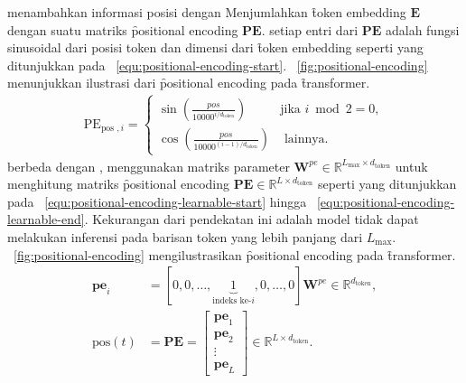 	\cite{transformerori} menambahkan informasi posisi dengan Menjumlahkan \f{token embedding} $\mathbf{E}$ dengan suatu matriks \f{positional encoding} $\mathbf{PE}$. setiap entri dari $\mathbf{PE}$ adalah fungsi sinusoidal dari posisi token  dan dimensi dari \f{token embedding} seperti yang ditunjukkan pada \equ~\ref{equ:positional-encoding-start}. \pic~\ref{fig:positional-encoding} menunjukkan ilustrasi dari \f{positional encoding} pada \f{transformer}.
	\begin{align}
		\label{equ:positional-encoding-start}
		\text{PE}_{ \text {pos }, i}= \begin{cases}\sin \left(\frac{p o s}{10000^{i / d_{\text {token}}}}\right) & \text {jika } i \bmod 2=0 ,\\ \cos \left(\frac{p o s}{10000^{(i-1) / d_{\text {token}}}}\right) & \text { lainnya. }\end{cases}
	\end{align}
	berbeda dengan \cite{transformerori}, \cite{bertori} menggunakan matriks parameter $\mathbf{W}^{pe} \in \mathbb{R}^{L_{\max} \times d_{\text{token}}}$ untuk menghitung matriks \f{positional encoding} $\mathbf{PE} \in \mathbb{R}^{L \times d_{\text{token}}}$ seperti yang ditunjukkan pada \equ~\ref{equ:positional-encoding-learnable-start} hingga \equ~\ref{equ:positional-encoding-learnable-end}. Kekurangan dari pendekatan ini adalah model tidak dapat melakukan inferensi pada barisan token yang lebih panjang dari $L_{\max}$. \pic~\ref{fig:positional-encoding} mengilustrasikan \f{positional encoding} pada \f{transformer}.
	\begin{align}
		\label{equ:positional-encoding-learnable-start}
		\mathbf{pe}_{i} &= [0, 0,\dots, \underbrace{1}_{\text{indeks ke-}i},0, \dots, 0] \mathbf{W}^{pe} \in \mathbb{R}^{d_{\text{token}}}, \\
		\label{equ:positional-encoding-learnable-end}
		 \text{pos}(t) &= \mathbf{PE} = \begin{bmatrix}
			\mathbf{pe}_1 \\
			\mathbf{pe}_2 \\
			\vdots \\
			\mathbf{pe}_L
		\end{bmatrix} \in \mathbb{R}^{L \times d_{\text{token}}}.
	\end{align}


